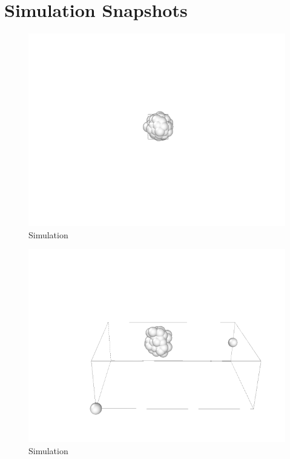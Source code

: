 \section{Simulation Snapshots}

\begin{figure}[!h]
	\begin{center}
		\includegraphics[scale= 1]{Figure/1Image.png}
	\end{center}
	\caption[Simulation]{Simulation }
	\label{Simulation1}
\end{figure}
\begin{figure}[!h]
	\begin{center}
		\includegraphics[scale=1]{Figure/2Image.png}
	\end{center}
	\caption[Simulation]{Simulation}
	\label{Simulation2}
\end{figure}
